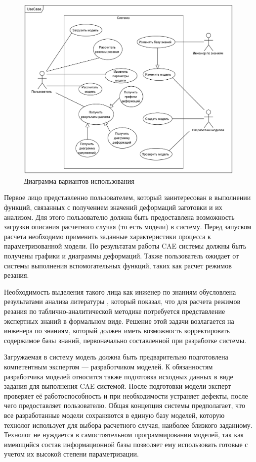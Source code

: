 \documentclass[14pt,oneside,final]{extreport}
\begin{document}
		\begin{figure}[!h]
		\begin{center}
		\includegraphics[scale=0.095]{img/ucd} 
		\end{center}
		\caption{Диаграмма вариантов использования}
		\label{fig:ucd}
		\end{figure}
		
	Первое лицо представленно пользователем, который заинтересован в выполнении функций, связанных с получением значений деформаций заготовки и их анализом. Для этого пользователю должна быть предоставлена возможность загрузки описания расчетного случая (то есть модели) в систему. Перед запуском расчета необходимо применить заданные характеристики процесса к параметризованной модели. По результатам работы CAE системы должны быть получены графики и диаграммы деформаций. Также пользователь ожидает от системы выполнения вспомогательных функций, таких как расчет режимов резания. 
	
	Необходимость выделения такого лица как инженер по знаниям обусловлена результатами анализа литературы \cite{book:Kosilova}, который показал, что для расчета режимов резания по таблично-аналитической методике потребуется представление экспертных знаний в формальном виде. Решение этой задачи возлагается на инженера по знаниям, который должен иметь возможность корректировать содержимое базы знаний, первоначально составленной при разработке системы.  

	Загружаемая в систему модель должна быть предварительно подготовлена компетентным экспертом --- разработчиком моделей. К обязанностям разработчика моделей относится также подготовка исходных данных в виде задания для выполнения CAE системой. После подготовки модели эксперт проверяет её работоспособность и при необходимости  устраняет дефекты, после чего предоставляет пользователю. Общая концепция системы предполагает, что все разработанные модели сохраняются в единую базу моделей, которую технолог использует для выбора расчетного случая, наиболее близкого заданному. Технолог не нуждается в самостоятельном программировании моделей, так как имеющийся состав информационной базы позволяет ему использовать готовые с учетом их высокой степени параметризации. 
	
\end{document}
